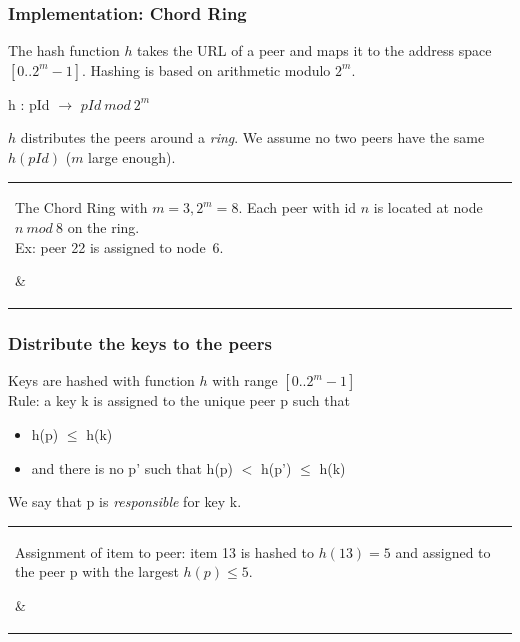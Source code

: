 \begin{frame}[fragile]
\frametitle{Implementation: Chord Ring}


The hash function $h$ takes the URL of a peer and maps
it to the address space $[0 .. 2^m-1]$. Hashing is based on 
arithmetic modulo $2^m$. 

\begin{center}
h : pId $\rightarrow$ $pId\ mod\ 2^m$
\end{center}

$h$ distributes the peers around a \emph{ring}.
We assume no two peers have the same $h(pId)$ ($m$ large enough). 

\begin{tabular}{m{.4\hsize}m{.4\hsize}}
   \parbox{\hsize}{The Chord Ring with $m=3, 2^m=8$.
Each peer with id $n$ is located
at node $n\ mod\ 8$ on the ring. \\
Ex: peer 22 is assigned to node~6.
}  %
  & 
\end{tabular}



\end{frame}

\begin{frame}[fragile]
\frametitle{Distribute the keys to the peers}

Keys are hashed with function $h$ with range $[0..2^m-1]$\\

Rule: a key k is assigned to the unique peer p such that  
\begin{itemize}
\item h(p) $\leq$ h(k)
\item \alert{and} there is no p' such that h(p) $<$ h(p') $\leq$ h(k) 
\end{itemize}

We say that p is \emph{responsible} for key k.
\begin{tabular}{m{.4\hsize}m{.5\hsize}}
   \parbox{\hsize}{Assignment of item to peer: item 13
   is hashed to $h(13) = 5$ and assigned to the
   peer p with the largest $h(p) \leq 5$.
}  %
  & 
\end{tabular}
\end{frame}


